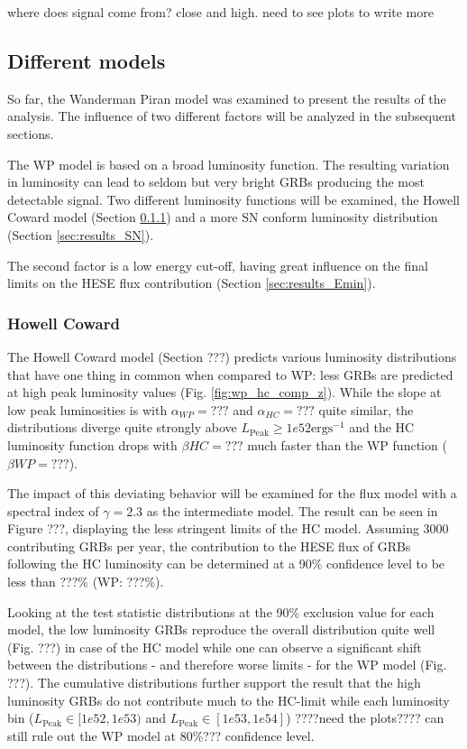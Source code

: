 where does signal come from? close and high. need to see plots to write more



\subsection{Different models}
So far, the Wanderman Piran model was examined to present the results of the
analysis. The influence of two different factors will be analyzed in the 
subsequent sections. 

The WP model is based on a broad luminosity function. The resulting variation 
in luminosity can lead to seldom but very bright GRBs producing the most 
detectable signal. Two different luminosity functions will be examined, the 
Howell Coward model (Section \ref{sec:results_HC}) and a more SN conform 
luminosity distribution (Section \ref{sec:results_SN}). 

The second factor is a low energy cut-off, having great influence on the final 
limits on the HESE flux contribution (Section \ref{sec:results_Emin}).

\subsubsection{Howell Coward}
\label{sec:results_HC}
The Howell Coward model (Section ???) predicts various luminosity distributions 
that have one thing in common when compared to WP: less GRBs are predicted at 
high peak luminosity values (Fig. \ref{fig:wp_hc_comp_z}). While the slope at 
low peak luminosities is with $\alpha_{WP}=???$ and $\alpha_{HC}=???$ quite 
similar,  the distributions diverge quite strongly above $L_\mathrm{Peak} \geq 
1e52 \mathrm{ erg} \mathrm{ s}^{-1}$ and the HC luminosity function drops with 
$\beta{HC}=???$ much faster than the WP function ($\beta{WP}=???$).

The impact of this deviating behavior will be examined for the flux model with 
a spectral index of $\gamma=2.3$ as the intermediate model. The result can be 
seen in Figure ???, displaying the less stringent limits of the HC model. 
Assuming 3000 contributing GRBs per year, the contribution to the HESE flux of 
GRBs following the HC luminosity can be determined at a 90\% confidence level to 
be less than ???\% (WP: ???\%).

Looking at the test statistic distributions at the 90\% exclusion value for 
each model, the low luminosity GRBs reproduce the overall distribution quite 
well (Fig. ???) in case of the HC model while one can observe a significant 
shift between the distributions - and therefore worse limits - for the WP model 
(Fig. ???). The cumulative distributions further support the result that the 
high luminosity GRBs do not contribute much to the HC-limit while each 
luminosity bin ($L_\mathrm{Peak} \in [1e52, 1e53)$ and $L_\mathrm{Peak} \in 
[1e53, 1e54]$) ????need the plots???? can still rule out the WP model at 
80\%??? confidence level.

